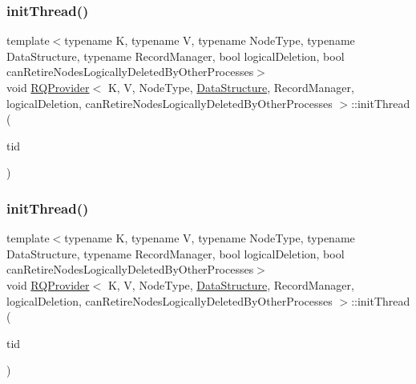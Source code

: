 \mbox{\label{classRQProvider_a3485da4cb5f94a1229cd31578b088f85}} 
\subsubsection{\texorpdfstring{init\+Thread()}{initThread()}\hspace{0.1cm}{\footnotesize\ttfamily [3/5]}}
{\footnotesize\ttfamily template$<$typename K, typename V, typename Node\+Type, typename Data\+Structure, typename Record\+Manager, bool logical\+Deletion, bool can\+Retire\+Nodes\+Logically\+Deleted\+By\+Other\+Processes$>$ \\
void \hyperlink{classRQProvider}{R\+Q\+Provider}$<$ K, V, Node\+Type, \hyperlink{classDataStructure}{Data\+Structure}, Record\+Manager, logical\+Deletion, can\+Retire\+Nodes\+Logically\+Deleted\+By\+Other\+Processes $>$\+::init\+Thread (\begin{DoxyParamCaption}\item[{const int}]{tid }\end{DoxyParamCaption})\hspace{0.3cm}{\ttfamily [inline]}}

\mbox{\label{classRQProvider_a3485da4cb5f94a1229cd31578b088f85}} 
\subsubsection{\texorpdfstring{init\+Thread()}{initThread()}\hspace{0.1cm}{\footnotesize\ttfamily [4/5]}}
{\footnotesize\ttfamily template$<$typename K, typename V, typename Node\+Type, typename Data\+Structure, typename Record\+Manager, bool logical\+Deletion, bool can\+Retire\+Nodes\+Logically\+Deleted\+By\+Other\+Processes$>$ \\
void \hyperlink{classRQProvider}{R\+Q\+Provider}$<$ K, V, Node\+Type, \hyperlink{classDataStructure}{Data\+Structure}, Record\+Manager, logical\+Deletion, can\+Retire\+Nodes\+Logically\+Deleted\+By\+Other\+Processes $>$\+::init\+Thread (\begin{DoxyParamCaption}\item[{const int}]{tid }\end{DoxyParamCaption})\hspace{0.3cm}{\ttfamily [inline]}}

